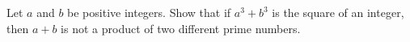 Let $a$ and $b$ be positive integers. Show that if $a^3+b^3$ is the square of an integer, then $a + b$ is not a product of two different prime numbers.